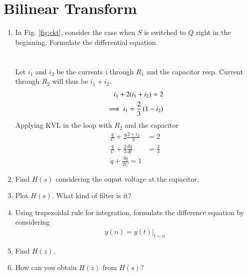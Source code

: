 \documentclass[journal,12pt,twocolumn]{IEEEtran}
\renewcommand\thesection{\arabic{section}}
\begin{document}
	\section{Bilinear Transform}
	\begin{enumerate}[label=\arabic*.,ref=\thesection.\theenumi]
	\item In Fig. 
				\ref{fig:ckt},
				consider the case when $S$ is switched to $Q$ right in the beginning. Formulate the differential equation.\\
				\solution \\\\
	
				Let $i_1$ and $i_2$ be the currents i through $R_1$ and the capacitor resp. Current through $R_2$ will thus be $i_1+i_2$.
				\begin{align}
					i_1+2(i_1+i_2) = 2\\
					\implies i_1 = \frac{2}{3}\left(1-i_2\right)\\
				\end{align}
				Applying KVL in the loop with $R_2$ and the capacitor
				\begin{align}
					\frac{q}{C} + 2\frac{2+i_2}{3} &= 2\\
					\frac{q}{C} +\frac{2}{3}\frac{dq}{dt} &= \frac{2}{3}\\
					\dot{q} + \frac{3q}{2C}=1
				\end{align}
				
	\item  Find $H(s)$ considering the ouput voltage at the capacitor.\\\solution
	\item Plot $H(s)$.  What kind of filter is it?
	\item Using trapezoidal rule for integration, formulate the difference equation
		by considering 
	\begin{align}
		y(n) = y(t)\vert_{t=n}
	\end{align}
	\item Find $H(z)$.
	\item How can you obtain $H(z)$ from $H(s)$?
	\end{enumerate}
\end{document}
